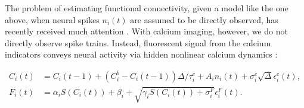 
The problem of estimating functional connectivity, given a model like the one above, when neural spikes $n_i(t)$ are assumed to be directly observed, has recently received much attention \cite{PILL07}. With calcium imaging, however, we do not directly observe spike trains. Instead, fluorescent signal from the calcium indicators conveys neural activity via hidden nonlinear calcium dynamics \cite{Vogelstein2009}: 

\begin{align} \label{eqn:ca:definition} %
C_i(t) &= C_i(t-1) + (C_i^b-C_i(t-1)) \Delta/\tau^c_i + A_i n_i(t)+\sigma^c_i \sqrt{\Delta} \epsilon^c_i(t), \\
F_i(t) &= \alpha_i S(C_i(t)) + \beta_i + \sqrt{\gamma_i S(C_i(t)) + \sigma^F_i} \epsilon^F_i(t). \label{eqn:F:definition}
\end{align}

